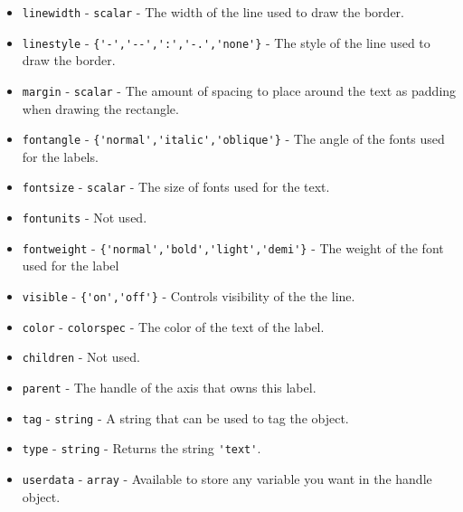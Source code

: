 \begin{itemize}
\item  \verb|linewidth| - \verb|scalar| - The width of the line used to draw the border.

\item  \verb|linestyle| - \verb|{'-','--',':','-.','none'}| - The style of the line used
 to draw the border.

\item  \verb|margin| - \verb|scalar| - The amount of spacing to place around the text as
 padding when drawing the rectangle.

\item  \verb|fontangle| - \verb|{'normal','italic','oblique'}| - The angle of the fonts used
 for the labels.

\item  \verb|fontsize| - \verb|scalar| - The size of fonts used for the text.

\item  \verb|fontunits| - Not used.

\item  \verb|fontweight| - \verb|{'normal','bold','light','demi'}| - The weight of the font used
 for the label

\item  \verb|visible| - \verb|{'on','off'}| - Controls visibility of the the line.

\item  \verb|color| - \verb|colorspec| - The color of the text of the label.

\item  \verb|children| - Not used.

\item  \verb|parent| - The handle of the axis that owns this label.

\item  \verb|tag| - \verb|string| - A string that can be used to tag the object.

\item  \verb|type| - \verb|string| - Returns the string \verb|'text'|.

\item  \verb|userdata| - \verb|array| - Available to store any variable you
 want in the handle object.

\end{itemize}
